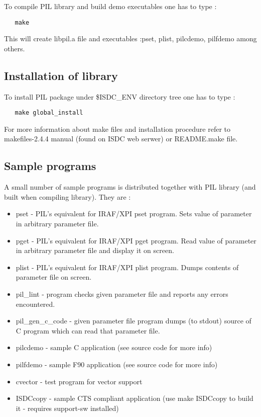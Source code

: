 To compile PIL library and build demo executables one has to type :

\begin{verbatim}
   make 
\end{verbatim}

This will create libpil.a file and executables :pset, plist, pilcdemo,
pilfdemo among others.


\subsection{Installation of library}

To install PIL package under \${ISDC\_ENV} directory tree one has to type :

\begin{verbatim}
   make global_install
\end{verbatim}

For more information about make files and installation procedure refer to 
makefiles-2.4.4 manual (found on ISDC web serwer) or README.make file.

\subsection{Sample programs}

A small number of sample programs is distributed together with PIL library
(and built when compiling library). They are :

\begin{itemize}
\item
pset - PIL's equivalent for IRAF/XPI pset program. Sets value of parameter
in arbitrary parameter file.
\item
pget - PIL's equivalent for IRAF/XPI pget program. Read value of parameter
in arbitrary parameter file and display it on screen.
\item
plist - PIL's equivalent for IRAF/XPI plist program. Dumps contents of
parameter file on screen.
\item
pil\_lint - program checks given parameter file and reports any errors
encountered.
\item
pil\_gen\_c\_code - given parameter file program dumps (to stdout) source
of C program which can read that parameter file.
\item
pilcdemo - sample C application (see source code for more info)
\item
pilfdemo - sample F90 application (see source code for more info)
\item
cvector - test program for vector support
\item
ISDCcopy - sample CTS compliant application (use make ISDCcopy to
build it - requires support-sw installed)
\end{itemize}

